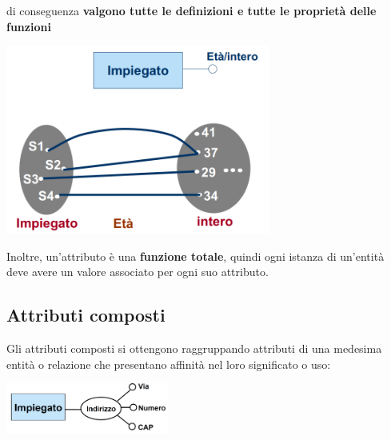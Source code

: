 \documentclass[12pt]{article}
\begin{document}
di conseguenza \textbf{valgono tutte le definizioni e tutte le proprietà delle funzioni}
\begin{center}
    \includegraphics[width = 0.65\textwidth]{Images/19.PNG}
\end{center}
Inoltre, un'attributo è una \textbf{funzione totale}, quindi ogni istanza di un'entità deve avere un valore associato per ogni suo attributo.
\subsection{Attributi composti}
Gli attributi composti si ottengono raggruppando attributi di una medesima entità o relazione che presentano affinità nel loro significato o uso:
\begin{center}
    \includegraphics[width = 0.40\textwidth]{Images/20.PNG}
\end{center}
\end{document}
